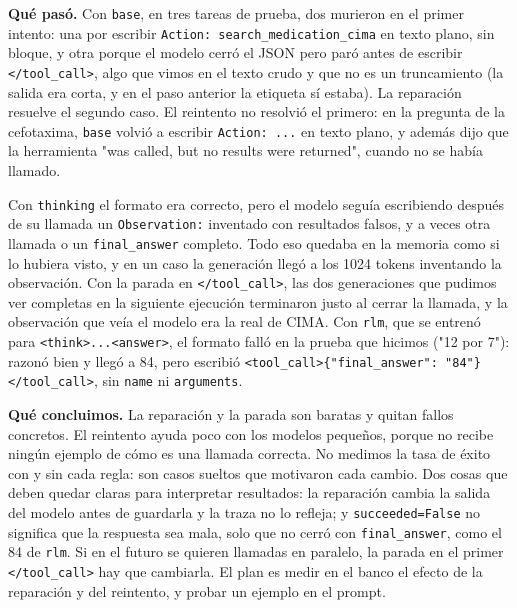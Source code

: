 \textbf{Qué pasó.} Con \texttt{base}, en tres tareas de prueba, dos murieron en el primer intento: una por escribir
\texttt{Action: search\_\allowbreak{}medication\_\allowbreak{}cima} en texto plano, sin bloque, y otra porque el modelo cerró el JSON pero
paró antes de escribir \texttt{\textless{}/\allowbreak{}tool\_\allowbreak{}call\textgreater{}}, algo que vimos en el texto crudo y que no es un truncamiento
(la salida era corta, y en el paso anterior la etiqueta sí estaba). La reparación resuelve el segundo
caso. El reintento no resolvió el primero: en la pregunta de la cefotaxima, \texttt{base} volvió a escribir
\texttt{Action: ...} en texto plano, y además dijo que la herramienta "was called, but no results were
returned", cuando no se había llamado.

Con \texttt{thinking} el formato era correcto, pero el modelo seguía escribiendo después de su llamada un
\texttt{Observation:} inventado con resultados falsos, y a veces otra llamada o un \texttt{final\_\allowbreak{}answer} completo.
Todo eso quedaba en la memoria como si lo hubiera visto, y en un caso la generación llegó a los 1024
tokens inventando la observación. Con la parada en \texttt{\textless{}/\allowbreak{}tool\_\allowbreak{}call\textgreater{}}, las dos generaciones que pudimos
ver completas en la siguiente ejecución terminaron justo al cerrar la llamada, y la observación que veía el modelo era la
real de CIMA. Con \texttt{rlm}, que se entrenó para \texttt{\textless{}think\textgreater{}...\textless{}answer\textgreater{}}, el formato falló en la prueba
que hicimos ("12 por 7"): razonó bien y llegó a 84, pero escribió
\texttt{\textless{}tool\_\allowbreak{}call\textgreater{}\{"final\_\allowbreak{}answer": "84"\}\textless{}/\allowbreak{}tool\_\allowbreak{}call\textgreater{}}, sin \texttt{name} ni \texttt{arguments}.

\textbf{Qué concluimos.} La reparación y la parada son baratas y quitan fallos concretos. El reintento ayuda
poco con los modelos pequeños, porque no recibe ningún ejemplo de cómo es una llamada correcta. No
medimos la tasa de éxito con y sin cada regla: son casos sueltos que motivaron cada cambio. Dos
cosas que deben quedar claras para interpretar resultados: la reparación cambia la salida del modelo
antes de guardarla y la traza no lo refleja; y \texttt{succeeded=\allowbreak{}False} no significa que la respuesta sea
mala, solo que no cerró con \texttt{final\_\allowbreak{}answer}, como el 84 de \texttt{rlm}. Si en el futuro se quieren llamadas en
paralelo, la parada en el primer \texttt{\textless{}/\allowbreak{}tool\_\allowbreak{}call\textgreater{}} hay que cambiarla. El plan es medir en el banco el
efecto de la reparación y del reintento, y probar un ejemplo en el prompt.

